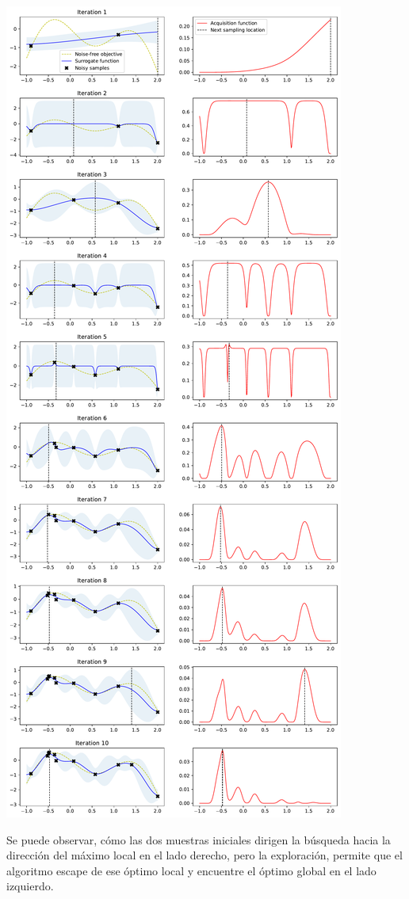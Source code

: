 \documentclass[
  12pt,
  letterpaper,
  DIV=11,
  numbers=noendperiod]{scrartcl}
\begin{document}
\includegraphics{ProyFinal_OptBayesiana_2024_y_files/figure-pdf/cell-6-output-1.pdf}

Se puede observar, cómo las dos muestras iniciales dirigen la búsqueda
hacia la dirección del máximo local en el lado derecho, pero la
exploración, permite que el algoritmo escape de ese óptimo local y
encuentre el óptimo global en el lado izquierdo.
\end{document}

